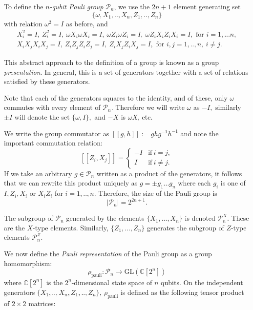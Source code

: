\documentclass[a4paper,onecolumn,11pt,unpublished]{quantumarticle}
\def\Complex{\mathbb{C}}
\def\Pauli{\mathcal{P}}
\def\GL{\mathrm{GL}}
\begin{document}
To define
the {\it $n$-qubit Pauli group} $\Pauli_n$, 
we use the $2n+1$ element 
generating set 
$$\{\omega , X_1, .., X_n, Z_1, .., Z_n\}$$
with relation $\omega^2=I$ as before, and
\begin{equation}\label{presentation}
\begin{array}{c}
X_i^2=I,\ Z_i^2=I,\ \omega X_i\omega X_i=I,\ \omega Z_i\omega Z_i=I,\ \omega Z_iX_iZ_iX_i=I, 
\mbox{\ for\ } i=1,...n,\\
X_iX_jX_iX_j=I,\ 
Z_iZ_jZ_iZ_j=I,\ 
Z_iX_jZ_iX_j=I, \mbox{\ for\ } i, j = 1,..,n,\ i\ne j.
\end{array}
\end{equation}

This abstract approach to the definition of a group is known as
a group \emph{presentation}. In general, this is a set of
generators together with a set of relations satisfied
by these generators.

Note that each of the generators squares to the identity,
and of these, only $\omega$ commutes with every element of $\Pauli_n.$
Therefore we will write $\omega$ as $-I,$
similarly $\pm I$ will denote the
set $\{\omega, I\},$ and $-X$ is $\omega X$, etc.

We write the group commutator as
$[[g, h]]:=ghg^{-1}h^{-1}$
and note the important commutation relation:
$$
    [[Z_i, X_j]] = 
    \left\{ \begin{array}{ll}
 -I &\mbox{if}\ i=j,\\
 I &\mbox{if}\ i\ne j.\end{array}\right.
$$
If we take an arbitrary $g\in \Pauli_n$
written as a product of the generators,
it follows that we can rewrite this
product uniquely as %
$ g = \pm g_1 ... g_n $
where each $g_i$ is one of $I, Z_i, X_i$ or $X_i Z_i$
for $i=1,..,n.$
Therefore, the size of the
Pauli group is 
$$
    |\Pauli_n| = 2^{2n+1}.
$$

The subgroup of $\Pauli_n$ generated by
the elements $\{X_1,...,X_n\}$ %
is denoted $\Pauli_n^X.$ These are the $X$-type
elements. Similarly,
 $\{Z_1,...,Z_n\}$ generates %
the subgroup of $Z$-type elements $\Pauli_n^Z$.

We now define the
{\it Pauli representation} 
of the Pauli group as a group homomorphism:
$$
    \rho_{\mathrm{pauli}} : \Pauli_n \to \GL(\Complex[2^n])
$$
where $\Complex[2^n]$ is the $2^n$-dimensional state space of $n$ qubits.
On the independent generators 
$\{X_1, .., X_n, Z_1, .., Z_n\},\ \rho_{\mathrm{pauli}}$
is defined as the following tensor product of $2\times 2$ matrices:
\end{document}
